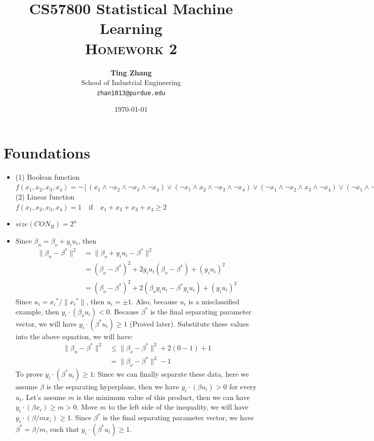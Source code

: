 \documentclass[11pt]{article}
\title{
\textbf{CS57800 Statistical Machine Learning} \\ \textsc{Homework 2} \\
\normalsize\vspace{0.1in}
}
\author{
	\textbf{Ting Zhang} \\
	School of Industrial Engineering\\
	\texttt{zhan1013@purdue.edu}
}
\date{\today}
\begin{document}
\maketitle

\section{Foundations}
\begin{itemize}
\item[1.]
(1) Boolean function \\
\(f(x_1,x_2,x_3,x_4)=\neg[(x_1\wedge \neg x_2\wedge \neg x_3\wedge\neg x_4)\vee
                     (\neg x_1\wedge  x_2\wedge \neg x_3\wedge\neg x_4)\vee
										 (\neg x_1\wedge \neg x_2\wedge  x_3\wedge\neg x_4)\vee
										 (\neg x_1\wedge \neg x_2\wedge \neg x_3\wedge x_4)\vee
										 (\neg x_1\wedge \neg x_2\wedge \neg x_3\wedge \neg x_4)] \) \\
(2) Linear function\\
\(f(x_1,x_2,x_3,x_4)=1 \quad \mathrm{if} \quad x_1+x_2+x_3+x_4 \geq 2\)
\item[2.]
\(size(CON_B)=2^n \)
\item[3.]
Since \(\beta_n = \beta_o+y_i u_i \), then
\begin{align*}
\|\beta_n-\beta^*\|^2 &=\|\beta_o+y_i u_i-\beta^*\|^2 \\
                      &=(\beta_o-\beta^*)^2+2y_i u_i(\beta_o-\beta^*)+(y_i u_i)^2 \\
											&=(\beta_o-\beta^*)^2+2(\beta_o y_i u_i-\beta^*y_i u_i)+(y_i u_i)^2
\end{align*}
Since \(u_i={x_i}^*/\|{x_i}^*\|\), then \(u_i=\pm 1\). Also, because \(u_i\) is a misclassified example, then \(y_i \cdot (\beta_o u_i)<0\). Because \(\beta^*\) is the final separating parameter vector, we will have \(y_i \cdot (\beta^* u_i) \geq 1\) (Proved later). Substitute these values into the above equation, we will have:
\begin{align*}
\|\beta_n-\beta^*\|^2 & \leq \|\beta_o-\beta^*\|^2+2(0-1)+1 \\
                      &=\|\beta_o-\beta^*\|^2-1 
\end{align*}
To prove \(y_i \cdot (\beta^* u_i) \geq 1\): Since we can finally separate these data, here we assume \(\beta\) is the separating hyperplane, then we have \(y_i \cdot (\beta u_i)>0\) for every \(u_i\). Let's assume \(m\) is the minimum value of this product, then we can have \(y_i \cdot (\beta x_i) \geq m>0\). Move \(m\) to the left side of the inequality, we will have \(y_i \cdot (\beta/m x_i) \geq 1\). Since  \(\beta^*\) is the final separating parameter vector, we have    \(\beta^*=\beta/m\), such that \(y_i \cdot (\beta^* u_i) \geq 1\).

\end{itemize}
\end{document}
